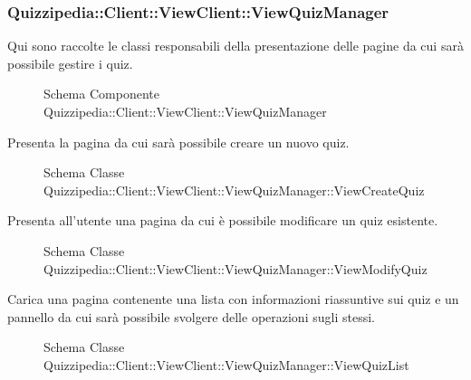 \subsubsection{Quizzipedia::Client::ViewClient::ViewQuizManager}
Qui sono raccolte le classi responsabili della presentazione delle pagine da cui sarà possibile gestire i quiz.
\begin{figure}[H]
\centering
\noindent{}
\caption{Schema Componente Quizzipedia::Client::ViewClient::ViewQuizManager}
\end{figure}
Presenta la pagina da cui sarà possibile creare un nuovo quiz.
\begin{figure}[H]
\centering
\noindent{}
\caption{Schema Classe Quizzipedia::Client::ViewClient::ViewQuizManager::ViewCreateQuiz}
\end{figure}
Presenta all'utente una pagina da cui è possibile modificare un quiz esistente.
\begin{figure}[H]
\centering
\noindent{}
\caption{Schema Classe Quizzipedia::Client::ViewClient::ViewQuizManager::ViewModifyQuiz}
\end{figure}
Carica una pagina contenente una lista con informazioni riassuntive sui quiz e un pannello da cui sarà possibile svolgere delle operazioni sugli stessi.
\begin{figure}[H]
\centering
\noindent{}
\caption{Schema Classe Quizzipedia::Client::ViewClient::ViewQuizManager::ViewQuizList}
\end{figure}

